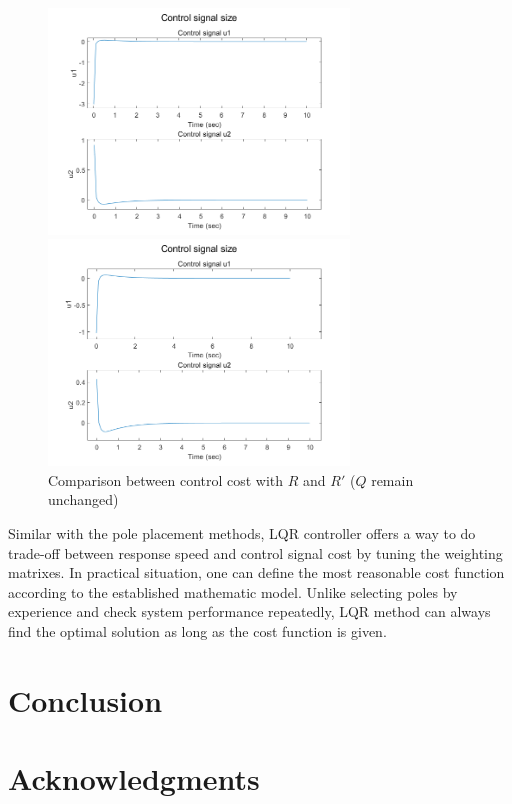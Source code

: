 \documentclass[hyperref]{article}
\theoremstyle{nonumberplain}
\begin{document}
\begin{figure}[H]
		\begin{minipage}[t]{0.48\textwidth}
			\centering
			\includegraphics[width=8cm]{fig17.png}
		\end{minipage}
		\begin{minipage}[t]{0.48\textwidth}
			\centering
			\includegraphics[width=8cm]{fig19.png}
		\end{minipage}
		\caption{Comparison between control cost with $R$ and ${R}'$ ($Q$ remain unchanged)}
		
		\label{fig14}
	\end{figure}

	Similar with the pole placement methods, LQR controller offers a way to do trade-off between response speed and control signal cost by tuning the weighting matrixes. In practical situation, one can define the most reasonable cost function according to the established mathematic model. Unlike selecting poles by experience and check system performance repeatedly, LQR method can always find the optimal solution as long as the cost function is given.
	
	
	
	\section{Conclusion}
	\section*{Acknowledgments}
	
	
	
	{}
	
\end{document}
